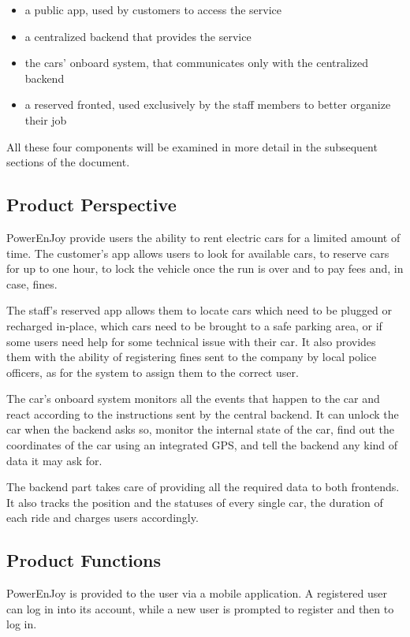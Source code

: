 \documentclass[11pt]{article} %
\newcommand{\pe}{PowerEnJoy }
\begin{document}
\begin{itemize}
	\item a public app, used by customers to access the service
	\item a centralized backend that provides the service
	\item the cars' onboard system, that communicates only with the centralized backend
	\item a reserved fronted, used exclusively by the staff members to better organize their job
\end{itemize}
All these four components will be examined in more detail in the subsequent sections of the document.


\subsection{Product Perspective}
  
  \pe provide users the ability to rent electric cars for a limited amount of time. The customer's app allows users to look for available cars, to reserve cars for up to one hour, to lock the vehicle once the run is over and to pay fees and, in case, fines.

The staff's reserved app allows them to locate cars which need to be plugged or recharged in-place, which cars need to be brought to a safe parking area, or if some users need help for some technical issue with their car. It also provides them with the ability of registering fines sent to the company by local police officers, as for the system to assign them to the correct user.

The car's onboard system monitors all the events that happen to the car and react according to the instructions sent by the central backend. It can unlock the car when the backend asks so, monitor the internal state of the car, find out the coordinates of the car using an integrated GPS, and tell the backend any kind of data it may ask for.

The backend part takes care of providing all the required data to both frontends. It also tracks the position and the statuses of every single car, the duration of each ride and charges users accordingly.
  
\subsection{Product Functions}
  
  \pe is provided to the user via a mobile application. A registered user can log in into its account, while a new user is prompted to register and then to log in.
  
\end{document}
